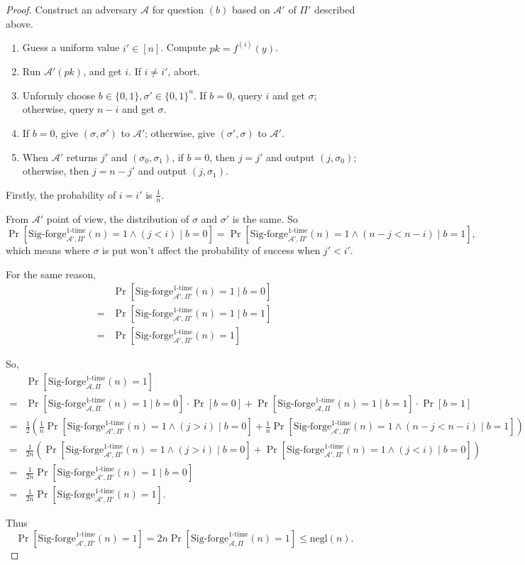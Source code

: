 \documentclass[a4paper]{article}
\newcommand{\negl}{\text{negl}}
\newcommand{\otime}{\text{1-time}}
\newcommand{\A}{\mathcal{A}}
\newenvironment{problem}[2][Problem]{\begin{trivlist}
\item[\hskip \labelsep {\bfseries #1}\hskip \labelsep {\bfseries #2.}]}{\end{trivlist}}
\begin{document}
\begin{problem}{12.8}
\begin{proof}
Construct an adversary $\A$ for question $(b)$ based on $\A'$ of $\Pi'$ described above.\par 
\begin{enumerate}
    \item Guess a uniform value $i'\in[n]$. Compute $pk=f^{(i)}(y)$.
    \item Run $\A'(pk)$, and get $i$. If $i\ne i'$, abort.
    \item Unformly choose $b\in\{0,1\},\sigma'\in\{0,1\}^n$.
    If $b=0$, query $i$ and get $\sigma$; otherwise, query $n-i$ and get $\sigma$.
    \item If $b=0$, give $(\sigma,\sigma')$ to $\A'$; otherwise, give $(\sigma',\sigma)$ to $\A'$.
    \item When $\A'$ returns $j'$ and $(\sigma_0,\sigma_1)$, if $b=0$, then $j=j'$ and output $(j,\sigma_0)$; otherwise, then $j=n-j'$ and output $(j,\sigma_1)$.
\end{enumerate}\par
Firstly, the probability of $i=i'$ is $\frac1n$.\par
From $\A'$ point of view, the distribution of $\sigma$ and $\sigma'$ is the same. So
$$\Pr[\text{Sig-forge}_{\A',\Pi'}^{\otime}(n)=1\land (j<i)\mid b=0]=\Pr[\text{Sig-forge}_{\A',\Pi'}^{\otime}(n)=1\land (n-j<n-i)\mid b=1],$$ which means where $\sigma$ is put won't affect the probability of success when $j'<i'$.\par
For the same reason,
\begin{align*}
    &\Pr[\text{Sig-forge}_{\A',\Pi'}^{\otime}(n)=1\mid b=0]\\
    =&\Pr[\text{Sig-forge}_{\A',\Pi'}^{\otime}(n)=1\mid b=1]\\
    =&\Pr[\text{Sig-forge}_{\A',\Pi'}^{\otime}(n)=1]
\end{align*}\par
So,
\begin{align*}
    &\Pr[\text{Sig-forge}_{\A,\Pi}^{\otime}(n)=1]\\
    =&\Pr[\text{Sig-forge}_{\A,\Pi}^{\otime}(n)=1\mid b=0]\cdot\Pr[b=0]+\Pr[\text{Sig-forge}_{\A,\Pi}^{\otime}(n)=1\mid b=1]\cdot\Pr[b=1]\\
    =&\frac{1}{2}(\frac1n\Pr[\text{Sig-forge}_{\A',\Pi'}^{\otime}(n)=1\land (j>i)\mid b=0]+\frac1n\Pr[\text{Sig-forge}_{\A',\Pi'}^{\otime}(n)=1\land (n-j<n-i)\mid b=1])\\
    =&\frac{1}{2n}(\Pr[\text{Sig-forge}_{\A',\Pi'}^{\otime}(n)=1\land (j>i)\mid b=0]+\Pr[\text{Sig-forge}_{\A',\Pi'}^{\otime}(n)=1\land (j<i)\mid b=0])\\
    =&\frac{1}{2n}\Pr[\text{Sig-forge}_{\A',\Pi'}^{\otime}(n)=1\mid b=0]\\
    =&\frac{1}{2n}\Pr[\text{Sig-forge}_{\A',\Pi'}^{\otime}(n)=1].
\end{align*}\par
Thus $$\Pr[\text{Sig-forge}_{\A',\Pi'}^{\otime}(n)=1]=2n\Pr[\text{Sig-forge}_{\A,\Pi}^{\otime}(n)=1]\le\negl(n).$$
\end{proof}
\end{problem}
\end{document}
